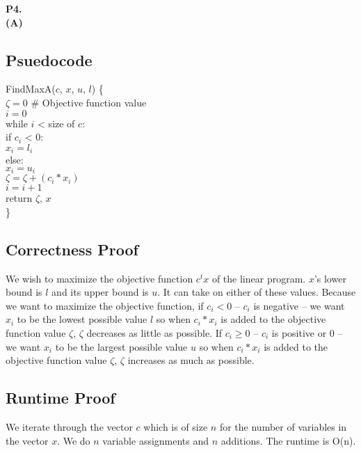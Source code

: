 \documentclass[11pt]{article}
\begin{document}
\bigskip

\noindent\textbf{P4.}
\\
\noindent\textbf{(A)}
\\
\subsection*{Psuedocode}
{\selectfont
FindMaxA($c$, $x$, $u$, $l$) \{\\
$\zeta = 0$ \# Objective function value\\
$i = 0$ \\
while $i$ < size of $c$:\\
\hspace*{1em} if $c_i$ < 0: \\
\hspace*{2em} $x_i = l_i$ \\
\hspace*{1em} else: \\
\hspace*{2em} $x_i = u_i$ \\
\hspace*{1em} $\zeta = \zeta + (c_i*x_i)$ \\
\hspace*{1em} $i = i + 1$ \\
return $\zeta$, $x$ \\
\}
}
\subsection*{Correctness Proof}
We wish to maximize the objective function $c^tx$ of the linear program.  $x$'s lower bound is $l$ and its upper bound is $u$.  It can take on either of these values.  Because we want to maximize the objective function, if $c_i < 0$ -- $c_i$ is negative -- we want $x_i$ to be the lowest possible value $l$ so when $c_i*x_i$ is added to the objective function value $\zeta$, $\zeta$ decreases as little as possible.  If $c_i \ge 0$ -- $c_i$ is positive or 0 -- we want $x_i$ to be the largest possible value $u$ so when $c_i*x_i$ is added to the objective function value $\zeta$, $\zeta$ increases as much as possible.
\subsection*{Runtime Proof}
We iterate through the vector $c$ which is of size $n$ for the number of variables in the vector $x$.  We do $n$ variable assignments and $n$ additions.  The runtime is O(n).
\end{document}
